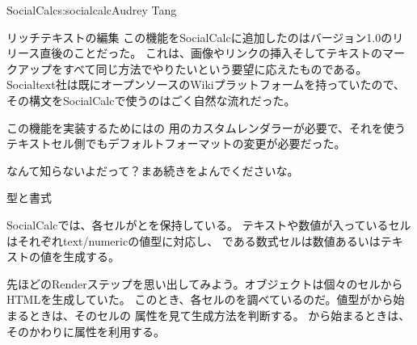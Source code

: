 \begin{aosachapter}{SocialCalc}{s:socialcalc}{Audrey Tang}
\begin{aosasect1}{リッチテキストの編集}
この機能をSocialCalcに追加したのはバージョン1.0のリリース直後のことだった。
これは、画像やリンクの挿入そしてテキストのマークアップをすべて同じ方法でやりたいという要望に応えたものである。
Socialtext社は既にオープンソースのWikiプラットフォームを持っていたので、
その構文をSocialCalcで使うのはごく自然な流れだった。

この機能を実装するためにはの
用のカスタムレンダラーが必要で、それを使うテキストセル側でもデフォルトフォーマットの変更が必要だった。

なんて知らないよだって？まあ続きをよんでくださいな。

\begin{aosasect2}{型と書式}

SocialCalcでは、各セルがとを保持している。
テキストや数値が入っているセルはそれぞれtext/numericの値型に対応し、
である数式セルは数値あるいはテキストの値を生成する。

先ほどのRenderステップを思い出してみよう。オブジェクトは個々のセルからHTMLを生成していた。
このとき、各セルのを調べているのだ。値型がから始まるときは、そのセルの
属性を見て生成方法を判断する。
から始まるときは、そのかわりに属性を利用する。


\end{aosasect2}
\end{aosasect1}
\end{aosachapter}
